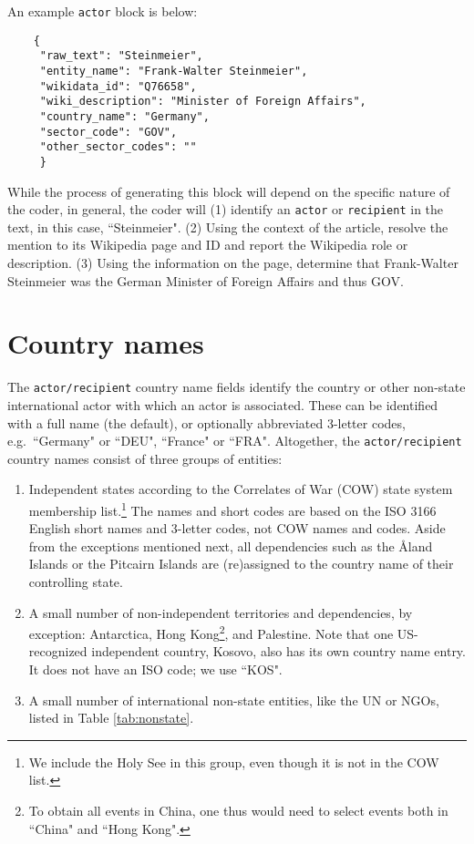 \documentclass[11pt]{report}
\newcommand{\txt}[1]{\texttt{#1}}
\begin{document}
An example \txt{actor} block is below:

\begin{verbatim}
	{
	 "raw_text": "Steinmeier",
	 "entity_name": "Frank-Walter Steinmeier",
	 "wikidata_id": "Q76658",
	 "wiki_description": "Minister of Foreign Affairs",
	 "country_name": "Germany",
	 "sector_code": "GOV",
	 "other_sector_codes": ""
	 }
\end{verbatim}

While the process of generating this block will depend on the specific nature of the coder, in general, the coder will (1) identify an  \txt{actor} or \txt{recipient} in the text, in this case, ``Steinmeier". (2) Using the context of the article, resolve the mention to its Wikipedia page and ID and report the Wikipedia role or description. (3) Using the information on the page, determine that Frank-Walter Steinmeier was the German Minister of Foreign Affairs and thus GOV.

\section{Country names}

The \texttt{actor/recipient} country name fields identify the country or other non-state international actor with which an actor is associated. These can be identified with a full name (the default), or optionally abbreviated 3-letter codes, e.g.\ ``Germany" or ``DEU", ``France" or ``FRA". Altogether, the \texttt{actor/recipient} country names consist of three groups of entities:

\begin{enumerate}
\item Independent states according to the Correlates of War (COW) state system membership list.\footnote{We include the Holy See in this group, even though it is not in the COW list.} The names and short codes are based on the ISO 3166 English short names and 3-letter codes, not COW names and codes. Aside from the exceptions mentioned next, all dependencies such as the \AA land Islands or the Pitcairn Islands are (re)assigned to the country name of their controlling state.
\item A small number of non-independent territories and dependencies, by exception: Antarctica, Hong Kong\footnote{To obtain all events in China, one thus would need to select events both in ``China" and ``Hong Kong".}, and Palestine. Note that one US-recognized independent country, Kosovo, also has its own country name entry. It does not have an ISO code; we use ``KOS".
\item A small number of international non-state entities, like the UN or NGOs, listed in Table \ref{tab:nonstate}.
\end{enumerate}
\end{document}
